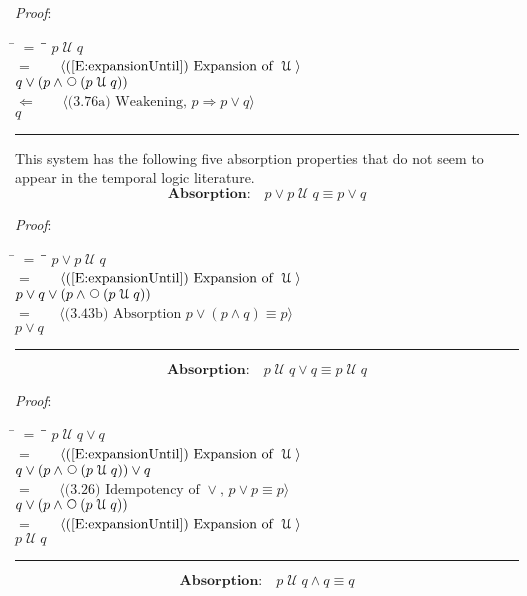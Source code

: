 \documentclass[12pt, fleqn, leqno]{article}
\newcommand{\lgap}{2pt}                             %
\newcommand{\mymathindent}{24pt}                    %
\newcommand{\impl}{\ensuremath{\Rightarrow}}        %
\newcommand{\foll}{\ensuremath{\Leftarrow}}         %
\newcommand{\Until}{\;\mathcal{U}\;}
\newcommand{\Next}{\;\,\text{\raisebox{3.5pt}{\circle{6}}}}
\newcommand{\myqed}{\rule[-.23ex]{1.2ex}{2.0ex}}
\newcommand{\myqedtab}{\hspace{384pt}}              %
\newcommand{\Gll} {\langle}                         %
\newcommand{\Ggg} {\rangle}                         %
\newcommand{\Hint}[1]     {\ \ \ $\Gll              \mbox{#1} \Ggg$ }   %
\begin{document}
\emph{Proof}:
\begin{tabbing}
\hspace{\mymathindent} \= $= \;$ \= \myqedtab \= \kill
\> \> $p \Until q$\\[\lgap]
\> $=$ \> \Hint{(\ref{E:expansionUntil}) Expansion of $\Until$} \\[\lgap]
\> \> $q \lor (p \land \Next(p \Until q))$\\[\lgap]
\> $\foll$ \> \Hint{(3.76a) Weakening, $p\impl p\lor q$} \\[\lgap]
\> \> $q$ \quad \myqed
\end{tabbing}

This system has the following five absorption properties that do not seem to
appear in the temporal logic literature.
\begin{equation}\label{E:untilOrP}
\textbf{Absorption:}\quad p \lor p \Until q \equiv p \lor q
\end{equation}

\emph{Proof}:
\begin{tabbing}
\hspace{\mymathindent} \= $= \;$ \= \myqedtab \= \kill
  \> \>   $p \lor p \Until q$\\[\lgap]
  \> $=$  \>  \Hint{(\ref{E:expansionUntil}) Expansion of $\Until$}\\[\lgap]
  \> \>   $p \lor q \lor (p \land \Next(p \Until q))$\\[\lgap]
  \> $=$  \>  \Hint{(3.43b) Absorption $p \lor (p \land q) \equiv p$}\\[\lgap]
  \> \>   $p \lor q$ \quad \myqed
\end{tabbing}
\begin{equation}\label{E:untilOrQ}
\textbf{Absorption:}\quad p \Until q \lor q \equiv p \Until q
\end{equation}

\emph{Proof}:
\begin{tabbing}
\hspace{\mymathindent} \= $= \;$ \= \myqedtab \= \kill
  \> \>   $p \Until q \lor q$\\[\lgap]
  \> $=$  \>  \Hint{(\ref{E:expansionUntil}) Expansion of $\Until$}\\[\lgap]
  \> \>   $q \lor (p \land \Next(p \Until q)) \lor q$\\[\lgap]
  \> $=$  \>  \Hint{(3.26) Idempotency of $\lor$, $p \lor p \equiv p$}\\[\lgap]
  \> \>   $q \lor (p \land \Next(p \Until q))$\\[\lgap]
  \> $=$  \>  \Hint{(\ref{E:expansionUntil}) Expansion of $\Until$}\\[\lgap]
  \> \>   $p \Until q$ \quad \myqed
\end{tabbing}
\begin{equation}\label{E:untilAndQ}
\textbf{Absorption:}\quad p \Until q \land q \equiv q
\end{equation}
\end{document}
